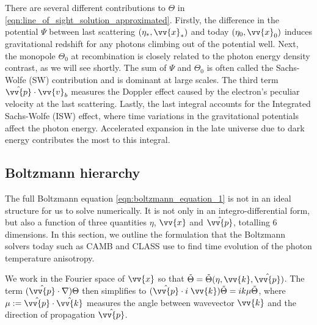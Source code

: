\documentclass[a4paper,12pt,times,custombib,print,index]{Classes/PhDThesisPSnPDF} %
\providecommand{\DIFadd}[1]{{\protect\color{blue}\uwave{#1}}} %
\providecommand{\DIFaddbegin}{} %
\providecommand{\DIFaddend}{} %
\newcommand{\DIFaddincludegraphics}[2][]{{\color{blue}\fbox{\DIFOincludegraphics[#1]{#2}}}} %
\DeclareRobustCommand{\DIFaddbegin}{\DIFOaddbegin \let\includegraphics\DIFaddincludegraphics} %
\DeclareRobustCommand{\DIFaddend}{\DIFOaddend \let\includegraphics\DIFOincludegraphics} %
\begin{document}
There are several different contributions to $\Theta$ in \eqref{eqn:line_of_sight_solution_approximated}. Firstly, the difference in the potential $\Psi$ between \DIFaddbegin \DIFadd{the }\DIFaddend last scattering $(\eta_*,\vv{x}_*)$ and today $(\eta_0, \vv{x}_0)$ induces gravitational redshift for any photons climbing out of the potential well. Next, the monopole $\Theta_0$ at recombination is closely related to the photon energy density contrast, as we will see shortly. The sum of $\Psi$ and $\Theta_0$ is often called the Sachs-Wolfe (SW) contribution and is dominant at large scales. The third term $\hat{\vv{p}}\cdot\vv{v}_b$ measures the Doppler effect caused by the electron's peculiar velocity at the last scattering. Lastly, the last integral accounts for the Integrated Sachs-Wolfe (ISW) effect, where time variations in the gravitational potentials affect the photon energy. Accelerated expansion in the late universe due to dark energy contributes the most to this integral.


\subsection{Boltzmann hierarchy} \label{section:boltzmann_hierarchy}

The full Boltzmann equation \eqref{eqn:boltzmann_equation_1} is not in an ideal structure for us to solve numerically. It is not only in an integro-differential form, but also a function of three quantities $\eta$, $\vv{x}$ and $\hat{\vv{p}}$, totalling 6 dimensions. In this section, we outline the formulation that the Boltzmann solvers today such as CAMB \cite{Lewis2000} and CLASS \cite{Blas2011class} use to find \DIFaddbegin \DIFadd{the }\DIFaddend time evolution of the photon temperature anisotropy.

We work in the Fourier space of $\vv{x}$ so that $\tilde{\Theta} = \tilde{\Theta}(\eta,\vv{k},\hat{\vv{p}})$. The term $(\hat{\vv{p}}\cdot\nabla)\Theta$ then simplifies to $(\hat{\vv{p}}\cdot i\;\vv{k})\tilde{\Theta} = ik\mu\tilde{\Theta}$, where $\mu := \hat{\vv{p}} \cdot \hat{\vv{k}}$ measures the angle between wavevector $\vv{k}$ and the direction of propagation $\hat{\vv{p}}$.
\end{document}

